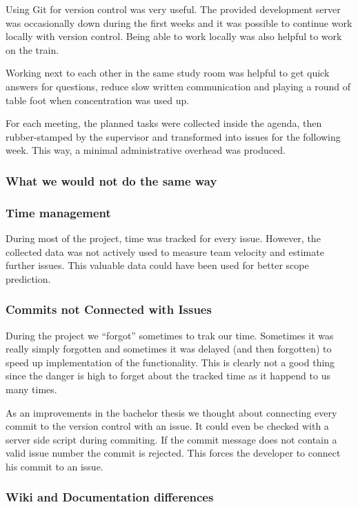 Using Git\cite{GIT} for
version 
control was very useful. The provided development server was occasionally down 
during the first weeks and it was possible to continue work locally with version
control. Being able to work locally was also helpful to work on the train. 

Working next to each other in the same study room was helpful to get quick 
answers for questions, reduce slow written communication and playing a round of 
table foot when concentration was used up.

For each meeting, the planned tasks were collected inside the agenda, then 
rubber-stamped by the supervisor and transformed into issues for the following 
week. This way, a minimal administrative overhead was produced.

\subsubsection{What we would not do the same way}

\subsubsection*{Time management}
During most of the project, time was tracked for every issue. 
However, the collected data was not actively used to measure team velocity and 
estimate further issues. This valuable data could have been used for better 
scope prediction.

\subsubsection*{Commits not Connected with Issues}

During the project we ``forgot'' sometimes to trak our time. Sometimes it was
really simply forgotten and sometimes it was delayed (and then forgotten) to
speed up implementation of the functionality. This is clearly not a good thing
since the danger is high to forget about the tracked time as it happend to us
many times.

As an improvements in the bachelor thesis we thought about connecting every
commit to the version control with an issue. It could even be checked with a
server side script during commiting. If the commit message does not contain a
valid issue number the commit is rejected. This forces the developer to connect
his commit to an issue.

\subsubsection*{Wiki and Documentation differences}

